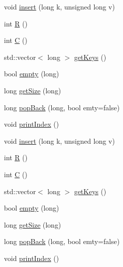 \begin{DoxyCompactItemize}
\item 
void \hyperlink{classHDB__supergate___1_1PtxtIndex_ab20a8fdd29fcbb48772689399929bbdb}{insert} (long k, unsigned long v)
\item 
int \hyperlink{classHDB__supergate___1_1PtxtIndex_a25639e96fd7fbb05fd2406fa8a9e43de}{R} ()
\item 
int \hyperlink{classHDB__supergate___1_1PtxtIndex_afea9f7f34f70aa0a1e0360f7c85e44c7}{C} ()
\item 
std\+::vector$<$ long $>$ \hyperlink{classHDB__supergate___1_1PtxtIndex_a217db4eccb954e6cbc796147bc2370de}{get\+Keys} ()
\item 
bool \hyperlink{classHDB__supergate___1_1PtxtIndex_ab270127936094cc3206e982bfa6cbac9}{empty} (long)
\item 
long \hyperlink{classHDB__supergate___1_1PtxtIndex_a9ca061073c7fc410b21460cccc0ef839}{get\+Size} (long)
\item 
long \hyperlink{classHDB__supergate___1_1PtxtIndex_aaa03f54cc4b9db5e1fc89fb5433f0925}{pop\+Back} (long, bool emty=false)
\item 
void \hyperlink{classHDB__supergate___1_1PtxtIndex_a29420568bf3ac7857139a72996b8f116}{print\+Index} ()
\item 
void \hyperlink{classHDB__supergate___1_1PtxtIndex_ab20a8fdd29fcbb48772689399929bbdb}{insert} (long k, unsigned long v)
\item 
int \hyperlink{classHDB__supergate___1_1PtxtIndex_a25639e96fd7fbb05fd2406fa8a9e43de}{R} ()
\item 
int \hyperlink{classHDB__supergate___1_1PtxtIndex_afea9f7f34f70aa0a1e0360f7c85e44c7}{C} ()
\item 
std\+::vector$<$ long $>$ \hyperlink{classHDB__supergate___1_1PtxtIndex_a217db4eccb954e6cbc796147bc2370de}{get\+Keys} ()
\item 
bool \hyperlink{classHDB__supergate___1_1PtxtIndex_ab270127936094cc3206e982bfa6cbac9}{empty} (long)
\item 
long \hyperlink{classHDB__supergate___1_1PtxtIndex_a9ca061073c7fc410b21460cccc0ef839}{get\+Size} (long)
\item 
long \hyperlink{classHDB__supergate___1_1PtxtIndex_aaa03f54cc4b9db5e1fc89fb5433f0925}{pop\+Back} (long, bool emty=false)
\item 
void \hyperlink{classHDB__supergate___1_1PtxtIndex_a29420568bf3ac7857139a72996b8f116}{print\+Index} ()
\end{DoxyCompactItemize}



